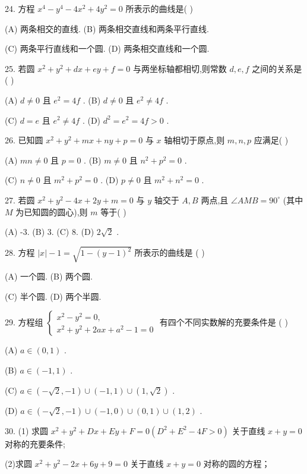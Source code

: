 24. 方程 ${x}^{4} - {y}^{4} - 4{x}^{2} + 4{y}^{2} = 0$ 所表示的曲线是(   )

(A) 两条相交的直线. (B) 两条相交直线和两条平行直线.

(C) 两条平行直线和一个圆. (D) 两条相交直线和一个圆.

25. 若圆 ${x}^{2} + {y}^{2} + {dx} + {ey} + f = 0$ 与两坐标轴都相切,则常数 $d,e,f$ 之间的关系是 (   )

(A) $d \neq  0$ 且 ${e}^{2} = {4f}$ . (B) $d \neq  0$ 且 ${e}^{2} \neq  {4f}$ .

(C) $d = e$ 且 ${e}^{2} \neq  {4f}$ . (D) ${d}^{2} = {e}^{2} = {4f} > 0$ .

26. 已知圆 ${x}^{2} + {y}^{2} + {mx} + {ny} + p = 0$ 与 $x$ 轴相切于原点,则 $m,n,p$ 应满足(   )

(A) ${mn} \neq  0$ 且 $p = 0$ . (B) $m \neq  0$ 且 ${n}^{2} + {p}^{2} = 0$ .

(C) $n \neq  0$ 且 ${m}^{2} + {p}^{2} = 0$ . (D) $p \neq  0$ 且 ${m}^{2} + {n}^{2} = 0$ .

27. 若圆 ${x}^{2} + {y}^{2} - {4x} + {2y} + m = 0$ 与 $y$ 轴交于 $A,B$ 两点,且 $\angle {AMB} = {90}^{ \circ  }$ (其中 $M$ 为已知圆的圆心),则 $m$ 等于(   )

(A) -3. (B) 3. (C) 8. (D) $2\sqrt{2}$ .

28. 方程 $\left| x\right|  - 1 = \sqrt{1 - {\left( y - 1\right) }^{2}}$ 所表示的曲线是 (   )

(A) 一个圆. (B) 两个圆.

(C) 半个圆. (D) 两个半圆.

29. 方程组 $\left\{  \begin{array}{l} {x}^{2} - {y}^{2} = 0, \\  {x}^{2} + {y}^{2} + {2ax} + {a}^{2} - 1 = 0 \end{array}\right.$ 有四个不同实数解的充要条件是 (   )

(A) $a \in  \left( {0,1}\right)$ .

(B) $a \in  \left( {-1,1}\right)$ .

(C) $a \in  \left( {-\sqrt{2}, - 1}\right)  \cup  \left( {-1,1}\right)  \cup  \left( {1,\sqrt{2}}\right)$ .

(D) $a \in  \left( {-\sqrt{2}, - 1}\right)  \cup  \left( {-1,0}\right)  \cup  \left( {0,1}\right)  \cup  \left( {1,2}\right)$ .

30. (1) 求圆 ${x}^{2} + {y}^{2} + {Dx} + {Ey} + F = 0\left( {{D}^{2} + {E}^{2} - {4F} > 0}\right)$ 关于直线 $x + y = 0$ 对称的充要条件;

(2)求圆 ${x}^{2} + {y}^{2} - {2x} + {6y} + 9 = 0$ 关于直线 $x + y = 0$ 对称的圆的方程；


